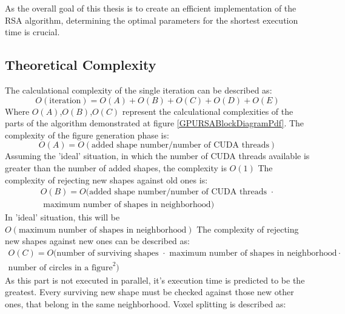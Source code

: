 \documentclass[12pt, oneside]{report}
\begin{document}
As the overall goal of this thesis is to create an efficient implementation of the RSA algorithm, determining the optimal parameters for the shortest execution time is crucial.

\subsection{Theoretical Complexity}

The calculational complexity of the single iteration can be described as: \newline
\begin{equation*}
	O(\text{iteration}) = O(A)+O(B)+O(C)+O(D)+O(E)
\end{equation*}
Where $O(A)$,$O(B)$,$O(C)$ represent the calculational complexities of the parts of the algorithm demonstrated at figure \ref{GPURSABlockDiagramPdf}. The complexity of the figure generation phase is:
\begin{equation*}
	O(A) = O(\text{added shape number}/ \text{number of CUDA threads})
\end{equation*}
Assuming the 'ideal' situation, in which the number of CUDA threads available is greater than the number of added shapes, the complexity is $O(1)$ \newline
The complexity of rejecting new shapes against old ones is: \newline
\begin{gather*}
	O(B) = O(\text{added shape number}/ \text{number of CUDA threads } \cdot \\ \text{ maximum number of shapes in neighborhood})
\end{gather*}
In 'ideal' situation, this will be $O(\text{maximum number of shapes in neighborhood})$ \newline
The complexity of rejecting new shapes against new ones can be described as: \newline
\begin{gather*}
	O(C) = O(\text{number of surviving shapes } \cdot
	\text{ maximum number of shapes in neighborhood} \cdot \\ \text{number of circles in a figure}^2)
\end{gather*}
As this part is not executed in parallel, it's execution time is predicted to be the greatest. Every surviving new shape must be checked against those new other ones, that belong in the same neighborhood. \newline
Voxel splitting is described as: \newline
\end{document}
